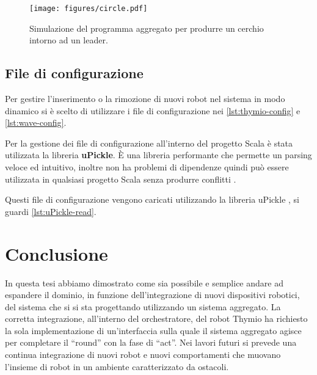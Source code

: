 \documentclass[12pt,a4paper,openright,twoside]{book}
\begin{document}
\begin{figure}
    \centering
    \texttt{[image: figures/circle.pdf]}
    \caption{Simulazione del programma aggregato per produrre un cerchio intorno ad un leader.}
    \label{fig:circle-formation}
\end{figure}

\section{File di configurazione}

Per gestire l'inserimento o la rimozione di nuovi robot nel sistema in modo dinamico si è scelto di utilizzare i file di configurazione nei \cref{lst:thymio-config} e \cref{lst:wave-config}.

Per la gestione dei file di configurazione all'interno del progetto Scala è stata utilizzata la libreria \textbf{uPickle}. È una libreria performante che permette un parsing veloce ed intuitivo, inoltre non ha problemi di dipendenze quindi può essere utilizzata in qualsiasi progetto Scala senza produrre conflitti \cite{uPickle}.





Questi file di configurazione vengono caricati utilizzando la libreria uPickle \cite{uPickle}, si guardi \cref{lst:uPickle-read}.



\chapter{Conclusione}
\label{chap:conclusione}

In questa tesi abbiamo dimostrato come sia possibile e semplice andare ad espandere il dominio, in funzione dell'integrazione di nuovi dispositivi robotici, del sistema che si si sta progettando utilizzando un sistema aggregato. La corretta integrazione, all'interno del orchestratore, del robot Thymio ha richiesto la sola implementazione di un'interfaccia sulla quale il sistema aggregato agisce per completare il ``round'' con la fase di ``act''. 
Nei lavori futuri si prevede una continua integrazione di nuovi robot e nuovi comportamenti che muovano l'insieme di robot in un ambiente caratterizzato da ostacoli.
\end{document}
